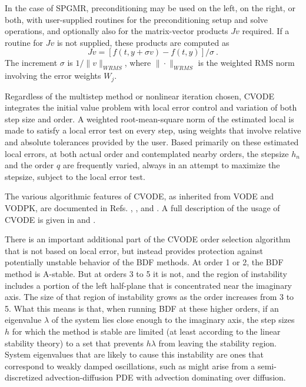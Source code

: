 In the case of SPGMR, preconditioning may be used on the left, on the
right, or both, with user-supplied routines for the preconditioning
setup and solve operations, and optionally also for the matrix-vector
products $Jv$ required.  If a routine for $Jv$ is not supplied, these
products are computed as
\[ Jv = [f(t,y+\sigma v) - f(t,y)]/\sigma ~. \]
The increment $\sigma$ is $1/\|v\|_{WRMS}$, where $\|\cdot\|_{WRMS}$
is the weighted RMS norm involving the error weights $W_j$.

Regardless of the multistep method or nonlinear iteration chosen,
CVODE integrates the initial value problem with local error control
and variation of both step size and order.  A weighted root-mean-square
norm of the estimated local is made to satisfy a local error test on
every step, using weights that involve relative and absolute
tolerances provided by the user.  Based primarily on these estimated
local errors, at both actual order and contemplated nearby orders, the
stepsize $h_n$ and the order $q$ are frequently varied, always in an
attempt to maximize the stepsize, subject to the local error test.

The various algorithmic features of CVODE, as inherited from VODE and
VODPK, are documented in Refs. \cite{BBH:89}, \cite{Byr:92}, and
\cite{Hin:00}.  A full description of the usage of CVODE is given in
\cite{CoHi:94} and \cite{ByHi:98}.

There is an important additional part of the CVODE order selection
algorithm that is not based on local error, but instead provides
protection against potentially unstable behavior of the BDF methods.
At order 1 or 2, the BDF method is A-stable.  But at orders 3 to 5 it
is not, and the region of instability includes a portion of the left
half-plane that is concentrated near the imaginary axis.  The size of
that region of instability grows as the order increases from 3 to 5.
What this means is that, when running BDF at these higher orders, if
an eigenvalue $\lambda$ of the system lies close enough to the
imaginary axis, the step sizes $h$ for which the method is stable are
limited (at least according to the linear stability theory) to a set
that prevents $h\lambda$ from leaving the stability region.  System
eigenvalues that are likely to cause this instability are ones that
correspond to weakly damped oscillations, such as might arise from a
semi-discretized advection-diffusion PDE with advection dominating
over diffusion.

